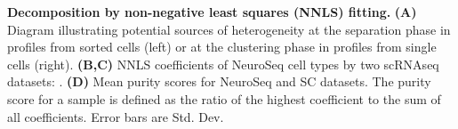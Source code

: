 \textbf{Decomposition by non-negative least squares (NNLS) fitting.}
\textbf{(A)} Diagram illustrating potential sources of heterogeneity at the separation phase in profiles from sorted cells (left) or at the clustering phase in profiles from single cells (right).
\textbf{(B,C)} NNLS coefficients of NeuroSeq cell types by two scRNAseq datasets: \citep{Tasic_2018,Zeisel_2018}.
\textbf{(D)} Mean purity scores for NeuroSeq and SC datasets. The purity score for a sample is defined as the ratio of the highest coefficient to the sum of all coefficients. Error bars are Std. Dev.